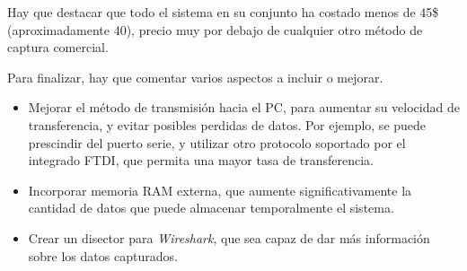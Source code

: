 \begin{resumen}
Hay que destacar que todo el sistema en su conjunto ha costado menos de 45\$ (aproximadamente 40\texteuro), precio muy por debajo de cualquier otro método de captura comercial.

Para finalizar, hay que comentar varios aspectos a incluir o mejorar.
\begin{itemize}
    \item Mejorar el método de transmisión hacia el PC, para aumentar su velocidad de transferencia, y evitar posibles perdidas de datos. Por ejemplo, se puede prescindir del puerto serie, y utilizar otro protocolo soportado por el integrado FTDI, que permita una mayor tasa de transferencia.
    \item Incorporar memoria RAM externa, que aumente significativamente la cantidad de datos que puede almacenar temporalmente el sistema.
    \item Crear un disector para \emph{Wireshark}, que sea capaz de dar más información sobre los datos capturados.
\end{itemize}

\end{resumen}



